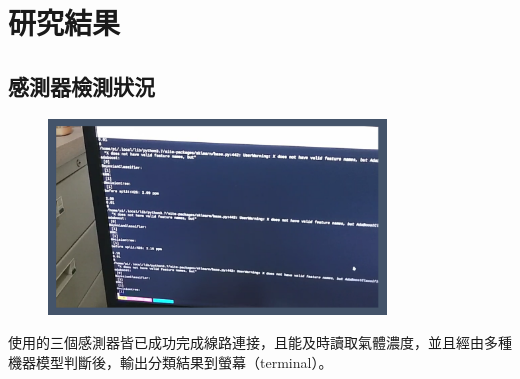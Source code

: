 \chapter{研究結果}

\section{感測器檢測狀況}
\begin{figure}[H]
	\centering
	\includegraphics[width=0.8\textwidth]{pic/terminal_output.png}
\end{figure}
使用的三個感測器皆已成功完成線路連接，且能及時讀取氣體濃度，並且經由多種機器模型判斷後，輸出分類結果到螢幕（terminal）。

